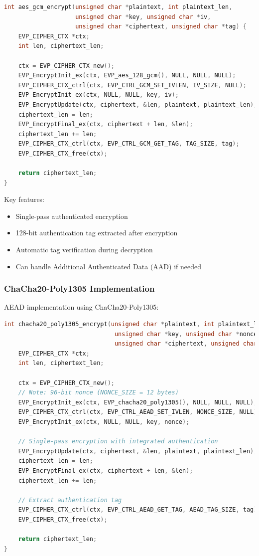 \documentclass[12pt,a4paper]{article}
\begin{document}
\begin{lstlisting}[language=C, caption=AES-GCM encryption (simplified)]
int aes_gcm_encrypt(unsigned char *plaintext, int plaintext_len,
                    unsigned char *key, unsigned char *iv,
                    unsigned char *ciphertext, unsigned char *tag) {
    EVP_CIPHER_CTX *ctx;
    int len, ciphertext_len;
    
    ctx = EVP_CIPHER_CTX_new();
    EVP_EncryptInit_ex(ctx, EVP_aes_128_gcm(), NULL, NULL, NULL);
    EVP_CIPHER_CTX_ctrl(ctx, EVP_CTRL_GCM_SET_IVLEN, IV_SIZE, NULL);
    EVP_EncryptInit_ex(ctx, NULL, NULL, key, iv);
    EVP_EncryptUpdate(ctx, ciphertext, &len, plaintext, plaintext_len);
    ciphertext_len = len;
    EVP_EncryptFinal_ex(ctx, ciphertext + len, &len);
    ciphertext_len += len;
    EVP_CIPHER_CTX_ctrl(ctx, EVP_CTRL_GCM_GET_TAG, TAG_SIZE, tag);
    EVP_CIPHER_CTX_free(ctx);
    
    return ciphertext_len;
}
\end{lstlisting}

Key features:
\begin{itemize}
    \item Single-pass authenticated encryption
    \item 128-bit authentication tag extracted after encryption
    \item Automatic tag verification during decryption
    \item Can handle Additional Authenticated Data (AAD) if needed
\end{itemize}

\subsubsection{ChaCha20-Poly1305 Implementation}
AEAD implementation using ChaCha20-Poly1305:

\begin{lstlisting}[language=C, caption=ChaCha20-Poly1305 encryption]
int chacha20_poly1305_encrypt(unsigned char *plaintext, int plaintext_len,
                               unsigned char *key, unsigned char *nonce,
                               unsigned char *ciphertext, unsigned char *tag) {
    EVP_CIPHER_CTX *ctx;
    int len, ciphertext_len;
    
    ctx = EVP_CIPHER_CTX_new();
    // Note: 96-bit nonce (NONCE_SIZE = 12 bytes)
    EVP_EncryptInit_ex(ctx, EVP_chacha20_poly1305(), NULL, NULL, NULL);
    EVP_CIPHER_CTX_ctrl(ctx, EVP_CTRL_AEAD_SET_IVLEN, NONCE_SIZE, NULL);
    EVP_EncryptInit_ex(ctx, NULL, NULL, key, nonce);
    
    // Single-pass encryption with integrated authentication
    EVP_EncryptUpdate(ctx, ciphertext, &len, plaintext, plaintext_len);
    ciphertext_len = len;
    EVP_EncryptFinal_ex(ctx, ciphertext + len, &len);
    ciphertext_len += len;
    
    // Extract authentication tag
    EVP_CIPHER_CTX_ctrl(ctx, EVP_CTRL_AEAD_GET_TAG, AEAD_TAG_SIZE, tag);
    EVP_CIPHER_CTX_free(ctx);
    
    return ciphertext_len;
}
\end{lstlisting}
\end{document}
